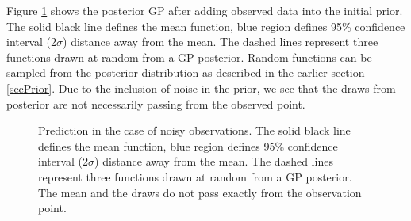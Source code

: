 Figure \ref{figGPNoisyPosteriors} shows the posterior GP after adding observed data into the initial prior. The solid black line defines the mean function, blue region defines 95\% confidence interval (2$\sigma$) distance away from the mean. The dashed lines represent three functions drawn at random from a GP posterior. Random functions can be sampled from the posterior distribution as described in the earlier section \ref{secPrior}.  Due to the inclusion of noise in the prior, we see that the draws from posterior are not necessarily passing from the observed point.

\begin{figure}[!ht]
  \centering
    \quad
{}\quad
  
       \caption{Prediction in the case of noisy observations. The solid black line defines the mean function, blue region defines 95\% confidence interval (2$\sigma$) distance away from the mean. The dashed lines represent three functions drawn at random from a GP posterior. The mean and the draws do not pass exactly from the observation point.}
       \label{figGPNoisyPosteriors}
\end{figure}

